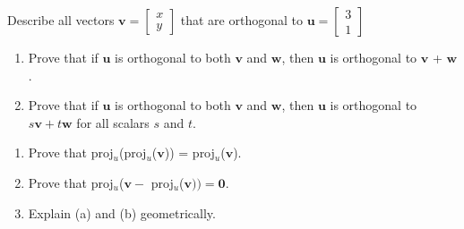 \documentclass[12pt,letterpaper]{hmcpset}
\begin{document}
\begin{problem}[50]
Describe all vectors $\mathbf{v} =  \begin{bmatrix}  x\\ y \end{bmatrix} $ that are orthogonal to $\mathbf{u} =  \begin{bmatrix}  3\\ 1 \end{bmatrix} $
\end{problem}
\begin{solution}

\end{solution}
\newpage

\begin{problem}[68]
	\begin{enumerate}
	\item Prove that if $\mathbf{u}$ is orthogonal to both $\mathbf{v}$ and $\mathbf{w}$, then $\mathbf{u}$ is orthogonal to 
		$\mathbf{v}$ + $\mathbf{w}$.
	\item Prove that if $\mathbf{u}$ is orthogonal to both $\mathbf{v}$ and $\mathbf{w}$, then $\mathbf{u}$ is orthogonal to 
		$s\mathbf{v} + t\mathbf{w}$ for all scalars $s$ and $t$.
	\end{enumerate}
\end{problem}
\begin{solution}
	
\end{solution}
\newpage

\begin{problem}[70]
	\begin{enumerate}
		\item Prove that proj$_u$(proj$_u$($\mathbf{v}$)) = proj$_u$($\mathbf{v}$).
		\item Prove that proj$_u$($\mathbf{v} - $ proj$_u$($\mathbf{v})) = \mathbf{0}$.
		\item Explain (a) and (b) geometrically. 
	\end{enumerate}
\end{problem}
\begin{solution}

\end{solution}
\end{document}
